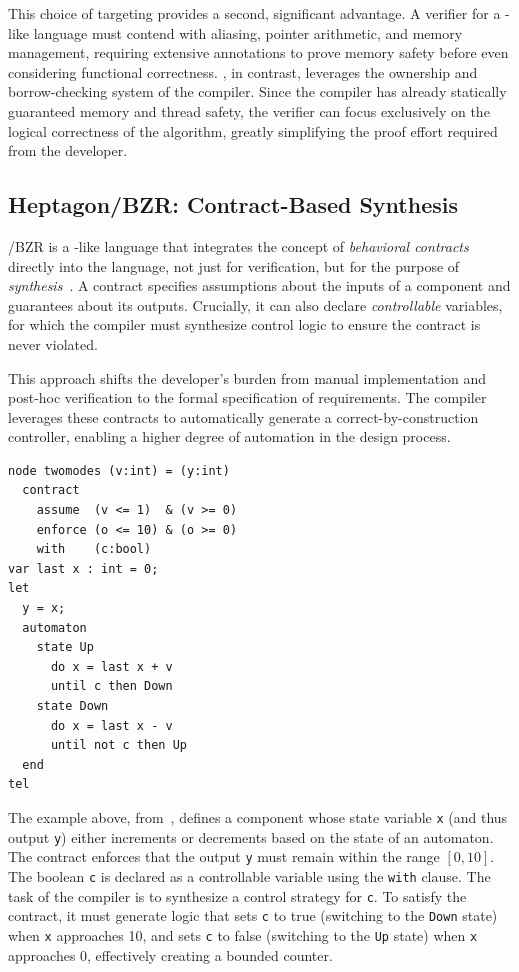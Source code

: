 This choice of targeting \Rust provides a second, significant advantage. A verifier for a \Ci-like
language must contend with aliasing, pointer arithmetic, and memory management, requiring extensive
annotations to prove memory safety before even considering functional correctness. \Creusot, in
contrast, leverages the ownership and borrow-checking system of the \Rust compiler. Since the
compiler has already statically guaranteed memory and thread safety, the verifier can focus
exclusively on the logical correctness of the algorithm, greatly simplifying the proof effort
required from the developer.

\subsection{Heptagon/BZR: Contract-Based Synthesis}
\label{sec:sota:synchronous:heptagon}

\Heptagon/BZR is a \Lustre-like language that integrates the concept of \emph{behavioral contracts}
directly into the language, not just for verification, but for the purpose of
\emph{synthesis}~\cite{DBLP:conf/lctrts/DelavalMR10}. A contract specifies assumptions about the
inputs of a component and guarantees about its outputs. Crucially, it can also declare
\emph{controllable} variables, for which the compiler must synthesize control logic to ensure the
contract is never violated.

This approach shifts the developer's burden from manual implementation and post-hoc verification to
the formal specification of requirements. The compiler leverages these contracts to automatically
generate a correct-by-construction controller, enabling a higher degree of automation in the design
process.

\begin{lstlisting}[basicstyle=\ttfamily\footnotesize\color{BlackText}]
node twomodes (v:int) = (y:int)
  contract
    assume  (v <= 1)  & (v >= 0)
    enforce (o <= 10) & (o >= 0)
    with    (c:bool)
var last x : int = 0;
let
  y = x;
  automaton
    state Up
      do x = last x + v
      until c then Down
    state Down
      do x = last x - v
      until not c then Up
  end
tel
\end{lstlisting}

The example above, from~\cite{heptreax_manual}, defines a component whose state variable \texttt{x}
(and thus output \texttt{y}) either increments or decrements based on the state of an automaton. The
contract enforces that the output \texttt{y} must remain within the range $[0, 10]$. The boolean
\texttt{c} is declared as a controllable variable using the \texttt{with} clause. The task of the
compiler is to synthesize a control strategy for \texttt{c}. To satisfy the contract, it must
generate logic that sets \texttt{c} to true (switching to the \texttt{Down} state) when \texttt{x}
approaches 10, and sets \texttt{c} to false (switching to the \texttt{Up} state) when \texttt{x}
approaches 0, effectively creating a bounded counter.

